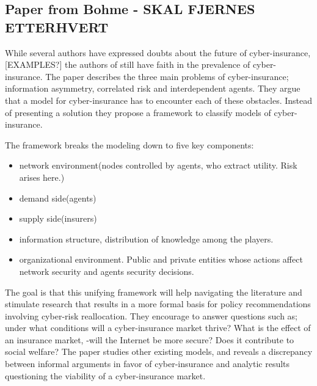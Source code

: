 \subsection{Paper from Bohme - SKAL FJERNES ETTERHVERT}
While several authors have expressed doubts about the future of cyber-insurance, [EXAMPLES?] the authors of \cite{bohme2010modeling} still have faith in the prevalence of cyber-insurance. The paper describes the three main problems of cyber-insurance; information asymmetry, correlated risk and interdependent agents. They argue that a model for cyber-insurance has to encounter each of these obstacles. Instead of presenting a solution they propose a framework to classify models of cyber-insurance. 

The framework breaks the modeling down to five key components: 
\begin{itemize}[topsep=-1em,parsep=0em,itemsep=0em] 
 \item network environment(nodes controlled by agents, who extract utility. Risk arises here.)
 \item demand side(agents) 
 \item supply side(insurers) 
 \item information structure, distribution of knowledge among the players. 
 \item organizational environment. Public and private entities whose actions affect network security and agents security decisions.
 
\end{itemize}
The goal is that this unifying framework will help navigating the literature and stimulate research that results in a more formal basis for policy recommendations involving cyber-risk reallocation. They encourage to answer questions such as; under what conditions will a cyber-insurance market thrive? What is the effect of an insurance market, -will the Internet be more secure? Does it contribute to social welfare?
The paper studies other existing models, and reveals a discrepancy between informal arguments in favor of cyber-insurance and analytic results questioning the viability of a cyber-insurance market. 



